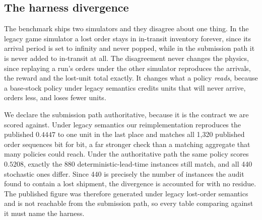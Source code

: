 \subsection{The harness divergence}
\label{sec:divergence}

The benchmark ships two simulators and they disagree about one thing. In the
legacy game simulator a lost order stays in in-transit inventory forever, since
its arrival period is set to infinity and never popped, while in the submission
path it is never added to in-transit at all. The disagreement never changes the
physics, since replaying a run's orders under the other simulator reproduces the
arrivals, the reward and the lost-unit total exactly. It changes what a policy
\emph{reads}, because a base-stock policy under legacy semantics credits units
that will never arrive, orders less, and loses fewer units.

We declare the submission path authoritative, because it is the contract we are
scored against. Under legacy semantics our reimplementation reproduces the
published $0.4447$ to one unit in the last place and matches all 1{,}320 published
order sequences bit for bit, a far stronger check than a matching aggregate that
many policies could reach. Under the authoritative path the same policy scores
$0.5208$, exactly the 880 deterministic-lead-time instances still match, and all
440 stochastic ones differ. Since 440 is precisely the number of instances the
audit found to contain a lost shipment, the divergence is accounted for with no
residue. The published figure was therefore generated under legacy lost-order
semantics and is not reachable from the submission path, so every table comparing
against it must name the harness.
